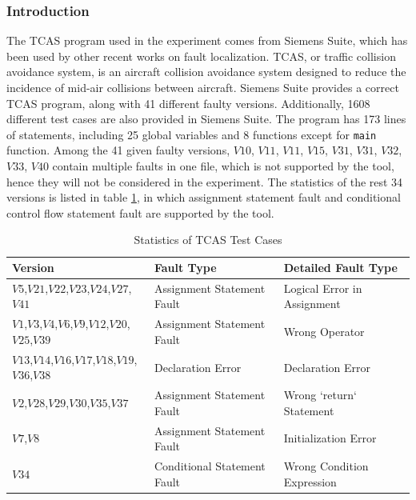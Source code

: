 \documentclass[10pt,journal,final,]{article}
\theoremstyle{definition}
\begin{document}
\subsubsection{Introduction}
The TCAS program used in the experiment comes from Siemens Suite, which has been used by other recent works on fault localization\cite{EotEoDaCBTAC,ESoaRTST}.
TCAS, or traffic collision avoidance system, is an aircraft collision avoidance system designed to reduce the incidence of mid-air collisions between aircraft\cite{TCAS}.
Siemens Suite provides a correct TCAS program, along with 41 different faulty versions. Additionally, 1608 different test cases are also provided in Siemens Suite.
The program has 173 lines of statements, including 25 global variables and 8 functions except for \lstinline|main| function.
Among the 41 given faulty versions, $V10$, $V11$, $V11$, $V15$, $V31$, $V31$, $V32$, $V33$, $V40$ contain multiple faults in one file, which is not supported by the tool, hence they will not be considered in the experiment.
The statistics of the rest 34 versions is listed in table \ref{table:SoTCASTC}, in which assignment statement fault and conditional control flow statement fault are supported by the tool.

\begin{table}
\small
\center
\caption{Statistics of TCAS Test Cases}
\label{table:SoTCASTC}
\begin{tabular}{lll}
\hline
Version&Fault Type&Detailed Fault Type \\
\hline
$V5$,$V21$,$V22$,$V23$,$V24$,$V27$,$V41$         &Assignment Statement Fault  &Logical Error in Assignment \\
$V1$,$V3$,$V4$,$V6$,$V9$,$V12$,$V20$,$V25$,$V39$ &Assignment Statement Fault  &Wrong Operator              \\
$V13$,$V14$,$V16$,$V17$,$V18$,$V19$,$V36$,$V38$  &Declaration Error           &Declaration Error           \\
$V2$,$V28$,$V29$,$V30$,$V35$,$V37$               &Assignment Statement Fault  &Wrong `return` Statement    \\
$V7$,$V8$                                        &Assignment Statement Fault  &Initialization Error        \\
$V34$                                            &Conditional Statement Fault &Wrong Condition Expression  \\
\hline
\end{tabular}
\end{table}
\end{document}
